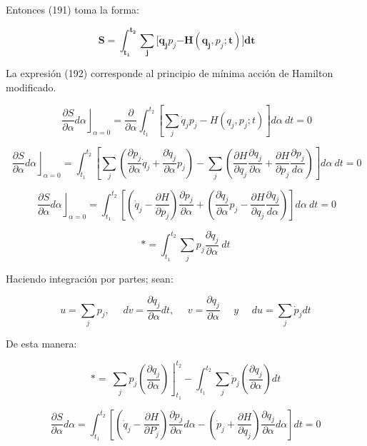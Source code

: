 \documentclass[]{article}
\begin{document}
Entonces (191) toma la forma:

\[\mathbf{S =}\int_{\mathbf{t}_{\mathbf{1}}}^{\mathbf{t}_{\mathbf{2}}}{\sum_{\mathbf{j}}^{}{\mathbf{\lbrack}{\dot{\mathbf{q}}}_{\mathbf{j}}p_{j}\mathbf{- H}\left( \mathbf{q}_{\mathbf{j}}\mathbf{,}p_{j}\mathbf{;t} \right)\mathbf{\rbrack}}\mathbf{dt}}\mathbf{\ \ \ \ \ \ \ \ }\]

La expresión (192) corresponde al principio de mínima acción de Hamilton
modificado.

\[\left. \ \frac{\partial S}{\partial\alpha}d\alpha \right\rfloor_{\alpha = 0} = \frac{\partial}{\partial\alpha}\int_{t_{1}}^{t_{2}}{\left\lbrack \sum_{j}^{}{{\dot{q}}_{j}p_{j} - H\left( q_{j},p_{j};t \right)} \right\rbrack d\alpha\ dt} = 0\]

\[\left. \ \frac{\partial S}{\partial\alpha}d\alpha \right\rfloor_{\alpha = 0} = \int_{t_{1}}^{t_{2}}{\left\lbrack \sum_{j}^{}\left( \frac{\partial p_{j}}{\partial\alpha}{\dot{q}}_{j} + \frac{\partial{\dot{q}}_{j}}{\partial\alpha}p_{j} \right) - \sum_{j}^{}\left( \frac{\partial H}{\partial q_{j}}\frac{\partial q_{j}}{\partial\alpha} + \frac{\partial H}{\partial p_{j}}\frac{\partial p_{j}}{d\alpha} \right) \right\rbrack d\alpha\ dt} = 0\]

\[\left. \ \frac{\partial S}{\partial\alpha}d\alpha \right\rfloor_{\alpha = 0} = \int_{t_{1}}^{t_{2}}{\left\lbrack \left( {\dot{q}}_{j} - \frac{\partial H}{\partial p_{j}} \right)\frac{\partial p_{j}}{\partial\alpha} + \left( \frac{\partial{\dot{q}}_{j}}{\partial\alpha}p_{j} - \frac{\partial H}{\partial q_{j}}\frac{{\partial q}_{j}}{d\alpha} \right) \right\rbrack d\alpha\ dt} = 0\]

\[* = \int_{t_{1}}^{t_{2}}{\sum_{j}^{}{p_{j}\frac{\partial{\dot{q}}_{j}}{\partial\alpha}}\ dt}\]

Haciendo integración por partes; sean:

\[u = \sum_{j}^{}p_{j},\ \ \ \ \ \ dv = \frac{\partial{\dot{q}}_{j}}{\partial\alpha}dt,\ \ \ \ \ \ v = \frac{{\partial q}_{j}}{\partial\alpha}\ \ \ \ \ \ y\ \ \ \ \ \ du = \sum_{j}^{}{\dot{p}}_{j}dt\]

De esta manera:

\[* = \left. \ \sum_{j}^{}{p_{j}\left( \frac{{\partial q}_{j}}{\partial\alpha} \right)} \right\rfloor_{t_{1}}^{t_{2}} - \int_{t_{1}}^{t_{2}}{\sum_{j}^{}{\dot{p}}_{j}\left( \frac{{\partial q}_{j}}{\partial\alpha} \right)dt}\]

\[\frac{\partial S}{\partial\alpha}d\alpha = \int_{t_{1}}^{t_{2}}\left\lbrack \left( {\dot{q}}_{j} - \frac{\partial H}{\partial P_{j}} \right)\frac{\partial p_{j}}{\partial\alpha}d\alpha - \left( {\dot{p}}_{j} + \frac{\partial H}{\partial q_{j}} \right)\frac{\partial q_{j}}{\partial\alpha}d\alpha \right\rbrack dt = 0\]
\end{document}
